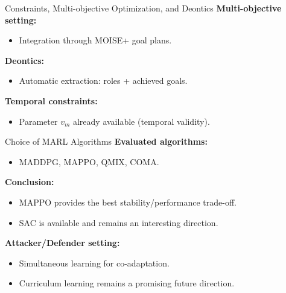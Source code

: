 \begin{frame}{Constraints, Multi-objective Optimization, and Deontics}
    \textbf{Multi-objective setting:}
    \begin{itemize}
        \item Integration through MOISE+ goal plans.
    \end{itemize}

    \textbf{Deontics:}
    \begin{itemize}
        \item Automatic extraction: roles + achieved goals.
    \end{itemize}

    \textbf{Temporal constraints:}
    \begin{itemize}
        \item Parameter $v_m$ already available (temporal validity).
    \end{itemize}
\end{frame}

\begin{frame}{Choice of MARL Algorithms}
    \textbf{Evaluated algorithms:}
    \begin{itemize}
        \item MADDPG, MAPPO, QMIX, COMA.
    \end{itemize}

    \textbf{Conclusion:}
    \begin{itemize}
        \item MAPPO provides the best stability/performance trade-off.
        \item SAC is available and remains an interesting direction.
    \end{itemize}

    \textbf{Attacker/Defender setting:}
    \begin{itemize}
        \item Simultaneous learning for co-adaptation.
        \item Curriculum learning remains a promising future direction.
    \end{itemize}
\end{frame}

